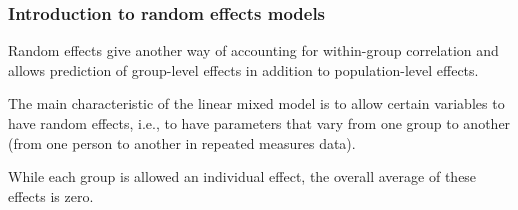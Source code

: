 \documentclass{beamer}
\begin{document}
% 

\begin{frame}
\frametitle{Introduction to random effects models}
 Random effects give another way of accounting for within-group correlation and allows prediction of group-level effects in addition to population-level effects.
 \bi \item The main characteristic of the \alert{linear mixed model} is to allow certain variables to have \alert{random effects}, i.e., \alert{to have parameters that vary from one group to another} (from one person to another in repeated measures data). 
\item While each group is allowed an individual effect, the overall average of these effects is zero.
\ei
\end{frame}

\end{document}
